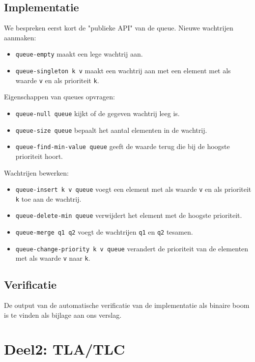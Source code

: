 \documentclass[a4paper,10pt]{article}
\begin{document}
\subsection{Implementatie}

We bespreken eerst kort de "publieke API" van de queue. Nieuwe wachtrijen
aanmaken:

\begin{itemize}
    \item \texttt{queue-empty} maakt een lege wachtrij aan.
    \item \texttt{queue-singleton k v} maakt een wachtrij aan met een element
    met als waarde \texttt{v} en als prioriteit \texttt{k}.
\end{itemize}

Eigenschappen van queues opvragen:

\begin{itemize}
    \item \texttt{queue-null queue} kijkt of de gegeven wachtrij leeg is.
    \item \texttt{queue-size queue} bepaalt het aantal elementen in de wachtrij.
    \item \texttt{queue-find-min-value queue} geeft de waarde terug die bij de
    hoogste prioriteit hoort.
\end{itemize}

Wachtrijen bewerken:

\begin{itemize}
    \item \texttt{queue-insert k v queue} voegt een element met als waarde
    \texttt{v} en als prioriteit \texttt{k} toe aan de wachtrij.
    \item \texttt{queue-delete-min queue} verwijdert het element met de hoogste
    prioriteit.
    \item \texttt{queue-merge q1 q2} voegt de wachtrijen \texttt{q1} en
    \texttt{q2} tesamen.
    \item \texttt{queue-change-priority k v queue} verandert de prioriteit van
    de elementen met als waarde \texttt{v} naar \texttt{k}.
\end{itemize}

\subsection{Verificatie}

De output van de automatische verificatie van de implementatie als binaire boom
is te vinden als bijlage aan ons verslag.

\section{Deel2: TLA/TLC}
\end{document}
